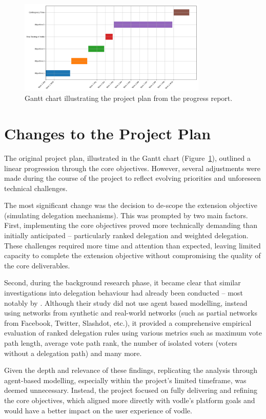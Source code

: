 \begin{figure}[H]
    \centering
    \includegraphics[width=0.8\textwidth]{../common/initial_gantt.png}
    \caption{Gantt chart illustrating the project plan from the progress report.}
    \label{fig:gantt}
\end{figure}


\section{Changes to the Project Plan}
The original project plan, illustrated in the Gantt chart (Figure~\ref{fig:gantt}), outlined a linear progression through the core objectives. However, several adjustments were made during the course of the project to reflect evolving priorities and unforeseen technical challenges.

The most significant change was the decision to de-scope the extension objective (simulating delegation mechanisms). This was prompted by two main factors. First, implementing the core objectives proved more technically demanding than initially anticipated -- particularly ranked delegation and weighted delegation. These challenges required more time and attention than expected, leaving limited capacity to complete the extension objective without compromising the quality of the core deliverables.

Second, during the background research phase, it became clear that similar investigations into delegation behaviour had already been conducted -- most notably by \citet{brill_liquid_2022}. Although their study did not use agent based modelling, instead using networks from synthetic and real-world networks (such as partial networks from Facebook, Twitter, Slashdot, etc.), it provided a comprehensive empirical evaluation of ranked delegation rules using various metrics such as maximum vote path length, average vote path rank, the number of isolated voters (voters without a delegation path) and many more.

Given the depth and relevance of these findings, replicating the analysis through agent-based modelling, especially within the project's limited timeframe, was deemed unnecessary. Instead, the project focused on fully delivering and refining the core objectives, which aligned more directly with vodle's platform goals and would have a better impact on the user experience of vodle.

